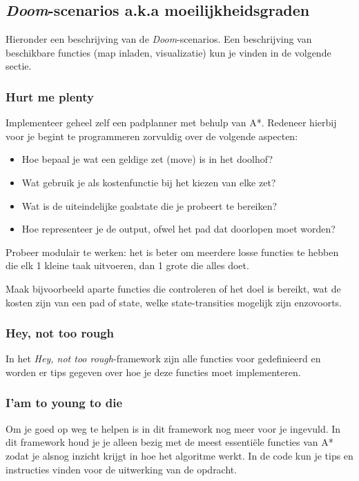 \documentclass[a4paper]{article}
\begin{document}
\subsection{\textit{Doom}-scenarios a.k.a moeilijkheidsgraden}
Hieronder een beschrijving van de \textit{Doom}-scenarios. Een beschrijving van beschikbare functies (map inladen, visualizatie) kun je vinden in de volgende sectie.

\subsubsection{Hurt me plenty}
Implementeer geheel zelf een padplanner met behulp van A*. Redeneer hierbij voor je begint te programmeren zorvuldig over de volgende aspecten:
\begin{itemize}
\item Hoe bepaal je wat een geldige zet (move) is in het doolhof?
\item Wat gebruik je als kostenfunctie bij het kiezen van elke zet?
\item Wat is de uiteindelijke goalstate die je probeert te bereiken?
\item Hoe representeer je de output, ofwel het pad dat doorlopen moet worden? 
\end{itemize}

Probeer modulair te werken: het is beter om meerdere losse functies te hebben die elk 1 kleine taak uitvoeren, dan 1 grote die alles doet.

Maak bijvoorbeeld aparte functies die controleren of het doel is bereikt, wat de kosten zijn van een pad of state, welke state-transities mogelijk zijn enzovoorts. 

\subsubsection{Hey, not too rough}
In het \textit{Hey, not too rough}-framework zijn alle functies voor gedefinieerd en worden er tips gegeven over hoe je deze functies moet implementeren.

\subsubsection{I'am to young to die}
Om je goed op weg te helpen is in dit framework nog meer voor je ingevuld. In dit framework houd je je alleen bezig met de meest essenti\"ele functies van A* zodat je alsnog inzicht krijgt in hoe het algoritme werkt. In de code kun je tips en instructies vinden voor de uitwerking van de opdracht.
\end{document}
